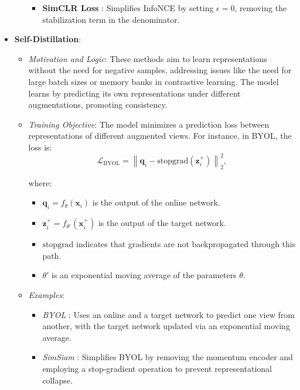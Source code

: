\begin{itemize}
\begin{itemize}
\begin{itemize}
            \item \textbf{SimCLR Loss} \citep{chen2020simple}: Simplifies InfoNCE by setting \(\epsilon = 0\), removing the stabilization term in the denominator.
        \end{itemize}
    \end{itemize}

    \item \textbf{Self-Distillation}:
    \begin{itemize}
        \item \emph{Motivation and Logic}: These methods aim to learn representations without the need for negative samples, addressing issues like the need for large batch sizes or memory banks in contrastive learning. The model learns by predicting its own representations under different augmentations, promoting consistency.
        
        \item \emph{Training Objective}: The model minimizes a prediction loss between representations of different augmented views. For instance, in BYOL, the loss is:
                \[
        \mathcal{L}_{\text{BYOL}} = \left\| \mathbf{q}_i - \text{stopgrad}(\mathbf{z}_i^+) \right\|_2^2,
        \]

        where:
        \begin{itemize}
            \item \( \mathbf{q}_i = f_{\theta}(\mathbf{x}_i) \) is the output of the online network.
            \item \( \mathbf{z}_i^+ = f_{\theta'}(\mathbf{x}_i^+) \) is the output of the target network.
            \item \( \text{stopgrad} \) indicates that gradients are not backpropagated through this path.
            \item \( \theta' \) is an exponential moving average of the parameters \( \theta \).
        \end{itemize}
        
        \item \emph{Examples}:
        \begin{itemize}
            \item \emph{BYOL} \citep{grill2020bootstrap}: Uses an online and a target network to predict one view from another, with the target network updated via an exponential moving average.
            \item \emph{SimSiam} \citep{chen2021exploring}: Simplifies BYOL by removing the momentum encoder and employing a stop-gradient operation to prevent representational collapse.
        \end{itemize}
    \end{itemize}


\end{itemize}
